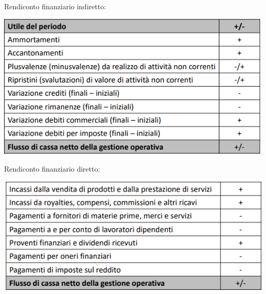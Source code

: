 \documentclass{scrreprt}
\begin{document}
Rendiconto finanziario indiretto:

\includegraphics[scale = 0.5]{rend_fin_ind.png}

Rendiconto finanziario diretto:

\includegraphics[scale = 0.5]{rend_fin_dir.png}
\end{document}
